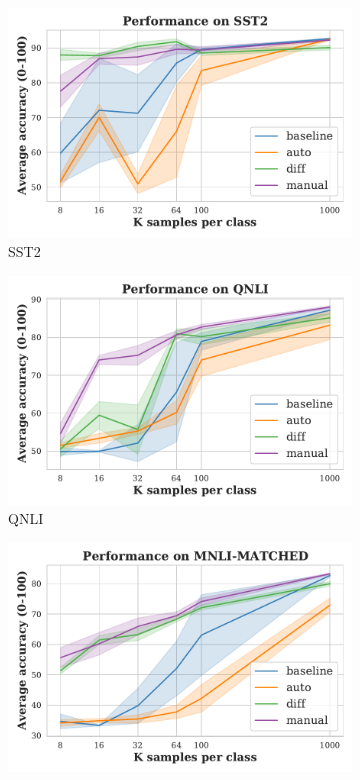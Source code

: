 \vspace{-0.3em}
\begin{figure}[!ht]
\begin{subfigure}{.33\textwidth}
  \centering
  \includegraphics[width=\linewidth]{figures/evaluation_media/SST2_prompting_performance.pdf}
  \caption{SST2}
  \label{fig:sst}
\end{subfigure}%
\begin{subfigure}{.33\textwidth}
  \centering
  \includegraphics[width=\linewidth]{figures/evaluation_media/QNLI_prompting_performance.pdf}
  \caption{QNLI}
  \label{fig:qnli}
\end{subfigure}
\begin{subfigure}{.33\textwidth}
  \centering
  \includegraphics[width=\linewidth]{figures/evaluation_media/MNLI-MATCHED_prompting_performance.pdf}

\end{subfigure}
\end{figure}
